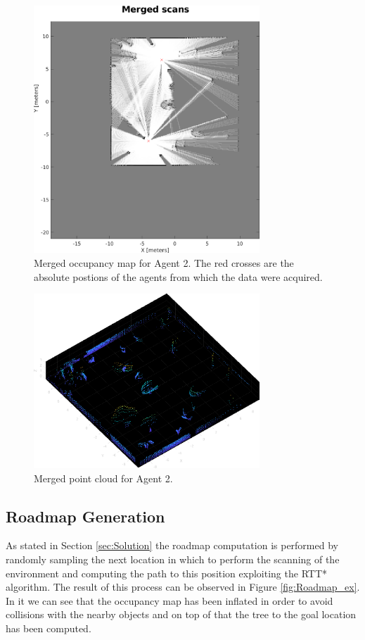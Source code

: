 \documentclass[twocolumn, a4paper]{article}
\begin{document}
\begin{figure}[h!]
    \centering
    \includegraphics[width=8.5cm]{"../Report_images/Merged_occupancies.png"}
    \caption{Merged occupancy map for Agent 2. The red crosses are the
             absolute postions of the agents from which the data were
             acquired.}
    \label{fig:occ_merged}
\end{figure}
\begin{figure}[h!]
    \centering
    \includegraphics[width=8.5cm]{"../Report_images/Merged_cloud.png"}
    \caption{Merged point cloud for Agent 2.}
    \label{fig:cloud_merged}
\end{figure}

\subsection{Roadmap Generation}
As stated in Section \ref{sec:Solution} the roadmap computation is
performed by randomly sampling the next location in which to perform the
scanning of the environment and computing the path to this position exploiting
the RTT* algorithm. The result of this process can be observed in Figure
\ref{fig:Roadmap_ex}. In it we can see that the occupancy map has been
inflated in order to avoid collisions with the nearby objects and on top
of that the tree to the goal location has been computed.
\end{document}
